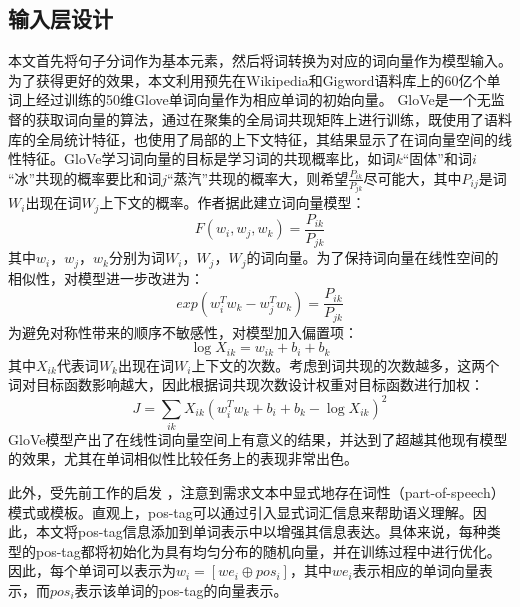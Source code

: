 \subsection{输入层设计}
本文首先将句子分词作为基本元素，然后将词转换为对应的词向量作为模型输入。为了获得更好的效果，本文利用预先在Wikipedia和Gigword语料库上的60亿个单词上经过训练的50维Glove单词向量\cite{pennington2014glove}作为相应单词的初始向量。
GloVe是一个无监督的获取词向量的算法，通过在聚集的全局词共现矩阵上进行训练，既使用了语料库的全局统计特征，也使用了局部的上下文特征，其结果显示了在词向量空间的线性特征。GloVe学习词向量的目标是学习词的共现概率比，如词$k$“固体”和词$i$“冰”共现的概率要比和词$j$“蒸汽”共现的概率大，则希望$\frac{P_{ik}}{P_{jk}}$尽可能大，其中$P_{ij}$是词$W_i$出现在词$W_j$上下文的概率。作者据此建立词向量模型：
$$F(w_i, w_j, w_k) = \frac{P_{ik}}{P_{jk}}$$
其中$w_i，w_j，w_k$分别为词$W_i，W_j，W_j$的词向量。为了保持词向量在线性空间的相似性，对模型进一步改进为：
$$exp(w_i^Tw_k-w_j^Tw_k)=\frac{P_{ik}}{P_{jk}}$$
为避免对称性带来的顺序不敏感性，对模型加入偏置项：
$$\log X_{ik}=w_{ik}+b_i+b_k$$
其中$X_{ik}$代表词$W_k$出现在词$W_i$上下文的次数。考虑到词共现的次数越多，这两个词对目标函数影响越大，因此根据词共现次数设计权重对目标函数进行加权：
$$J=\sum_{ik}X_{ik}(w_i^Tw_k+b_i+b_k-\log X_{ik})^2$$
GloVe模型产出了在线性词向量空间上有意义的结果，并达到了超越其他现有模型的效果，尤其在单词相似性比较任务上的表现非常出色。

此外，受先前工作的启发\cite{Sorbo2016Development} \cite{shi2017understanding}，注意到需求文本中显式地存在词性（part-of-speech）模式或模板。直观上，pos-tag可以通过引入显式词汇信息来帮助语义理解。因此，本文将pos-tag信息添加到单词表示中以增强其信息表达。具体来说，每种类型的pos-tag都将初始化为具有均匀分布的随机向量，并在训练过程中进行优化。因此，每个单词可以表示为$w_i=[we_i\oplus pos_i]$，其中$we_i$表示相应的单词向量表示，而$pos_i$表示该单词的pos-tag的向量表示。


